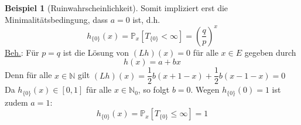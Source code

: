 \documentclass[a4paper,12pt]{scrartcl}
\theoremstyle{definition}
\newtheorem{bsp}{Beispiel}[section]
\begin{document}
\begin{bsp}[Ruinwahrscheinlichkeit]
Somit impliziert erst die Minimalitätsbedingung, dass $a=0$ ist, d.h.
\begin{equation*}
h_{\lbrace 0 \rbrace}(x) = \mathbb{P}_{x}[T_{\lbrace 0 \rbrace} < \infty] = (\dfrac{q}{p})^{x}
\end{equation*}
\underline{Beh.}: Für $p=q$ ist die Lösung von $(Lh)(x) = 0$ für alle  $x \in E$ gegeben durch 
\begin{equation*}
h(x) = a + bx
\end{equation*}
Denn für alle $x \in \mathbb{N}$ gilt $(Lh)(x) = \dfrac{1}{2}b(x + 1 -x) + \dfrac{1}{2}b(x -1 -x) = 0$
\\
Da $h_{\lbrace 0 \rbrace}(x) \in [0,1]$ für alle $x \in \mathbb{N}_{0}$, so folgt $b=0$. Wegen $h_{\lbrace 0 \rbrace}(0) = 1$ ist zudem $a = 1$:
\begin{equation*}
h_{\lbrace 0 \rbrace}(x) = \mathbb{P}_{x}[T_{\lbrace 0 \rbrace} \leq \infty] = 1
\end{equation*}
\end{bsp}
\end{document}
